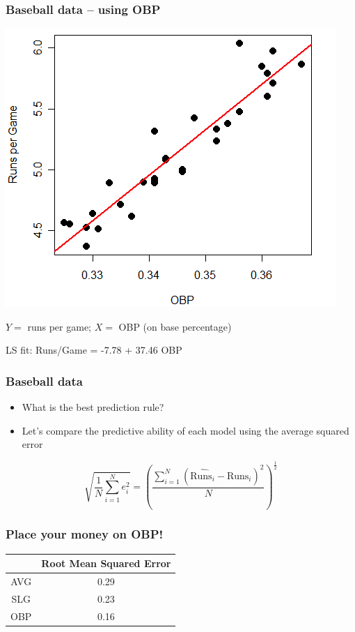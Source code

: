\documentclass{beamer}
\newcommand{\bo}[1]{\textcolor{burntorange}{#1}}
\newcommand{\bi}{\begin{itemize}}
\newcommand{\ib}{\end{itemize}}
\begin{document}
\begin{frame}
\frametitle{Baseball data -- using OBP} 

\vspace{-5.8mm}
\begin{center}
\includegraphics[scale=0.42]{figures/OBPR.png}
\end{center}

\vspace{-5.8mm}
$Y=$ runs per game; $X=$ OBP (on base percentage)

\vspace{1mm}
LS fit: {\color{red} Runs/Game = -7.78 + 37.46 OBP}
\end{frame}


\begin{frame}
\frametitle{Baseball data}
\bi
\item {\bo{ What is the best prediction rule?}}
\item Let's compare the predictive ability of each model using the average squared error
\ib

$$
\sqrt{\frac{1}{N}\sum_{i=1}^N{e_i^2}}  = \left(\frac{\sum_{i=1}^N{\left(\widehat{\text{Runs}_i} - \text{Runs}_i \right)^2}}{N}\right)^{\frac{1}{2}}
$$
\end{frame}

\begin{frame}
\frametitle{Place your money on OBP!}
\begin{center}
{\Large
\begin{tabular}{cc}
\hline
& Root Mean Squared Error \\
\hline 
AVG & 0.29 \\
SLG & 0.23 \\
{\bo{ OBP}} & {\bo{ 0.16}} \\
\hline
\end{tabular}
}
\end{center}
\end{frame}
\end{document}
